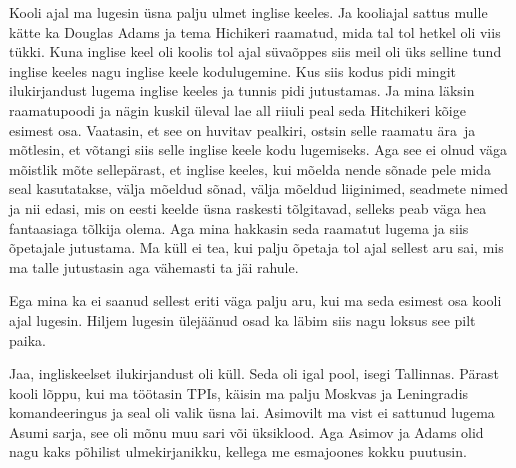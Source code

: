 Kooli ajal ma lugesin üsna palju ulmet inglise keeles. Ja kooliajal sattus mulle kätte ka Douglas Adams ja tema Hichikeri raamatud, mida tal tol hetkel oli viis tükki. Kuna inglise keel oli koolis tol ajal süvaõppes siis meil oli üks selline tund inglise keeles nagu inglise keele kodulugemine. Kus siis kodus pidi mingit ilukirjandust lugema inglise keeles ja tunnis pidi jutustamas. Ja mina läksin raamatupoodi ja nägin kuskil üleval lae all riiuli peal seda Hitchikeri kõige esimest osa. Vaatasin, et see on huvitav pealkiri, ostsin selle raamatu ära ja mõtlesin, et võtangi siis selle inglise keele kodu lugemiseks. Aga see ei olnud väga mõistlik mõte sellepärast, et inglise keeles, kui mõelda nende sõnade pele mida seal kasutatakse, välja mõeldud sõnad, välja mõeldud liiginimed, seadmete nimed ja nii edasi, mis on eesti keelde üsna raskesti tõlgitavad,  selleks peab väga hea fantaasiaga tõlkija olema. Aga mina hakkasin seda raamatut lugema ja siis õpetajale jutustama. Ma küll ei tea, kui palju õpetaja tol ajal sellest aru sai, mis ma talle jutustasin aga vähemasti ta jäi rahule. 


Ega mina ka ei saanud  sellest eriti väga palju aru, kui ma seda esimest osa kooli ajal lugesin. Hiljem lugesin  ülejäänud osad ka läbim siis nagu loksus see pilt paika.


Jaa, ingliskeelset ilukirjandust oli küll. Seda oli igal pool, isegi Tallinnas. Pärast kooli lõppu, kui ma töötasin TPIs, käisin ma palju Moskvas ja Leningradis komandeeringus ja seal oli valik üsna lai. Asimovilt ma vist ei sattunud lugema Asumi sarja, see oli mõnu muu sari või üksiklood. Aga Asimov ja Adams olid nagu kaks põhilist ulmekirjanikku, kellega me esmajoones kokku puutusin. 


